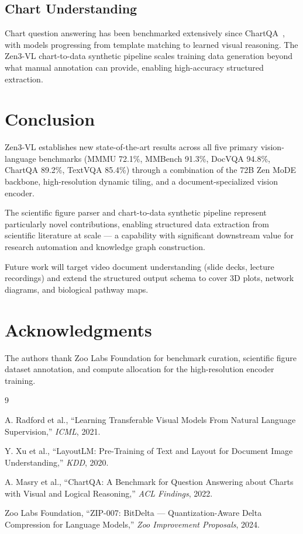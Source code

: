\documentclass[11pt,a4paper]{article}
\begin{document}
\subsection{Chart Understanding}

Chart question answering has been benchmarked extensively since ChartQA~\cite{chartqa},
with models progressing from template matching to learned visual reasoning. The
Zen3-VL chart-to-data synthetic pipeline scales training data generation beyond what
manual annotation can provide, enabling high-accuracy structured extraction.

\section{Conclusion}
\label{sec:conclusion}

Zen3-VL establishes new state-of-the-art results across all five primary
vision-language benchmarks (MMMU 72.1\%, MMBench 91.3\%, DocVQA 94.8\%,
ChartQA 89.2\%, TextVQA 85.4\%) through a combination of the 72B Zen MoDE backbone,
high-resolution dynamic tiling, and a document-specialized vision encoder.

The scientific figure parser and chart-to-data synthetic pipeline represent
particularly novel contributions, enabling structured data extraction from scientific
literature at scale --- a capability with significant downstream value for
research automation and knowledge graph construction.

Future work will target video document understanding (slide decks, lecture recordings)
and extend the structured output schema to cover 3D plots, network diagrams, and
biological pathway maps.

\section*{Acknowledgments}

The authors thank Zoo Labs Foundation for benchmark curation, scientific figure
dataset annotation, and compute allocation for the high-resolution encoder training.


\begin{thebibliography}{9}

A. Radford et al.,
``Learning Transferable Visual Models From Natural Language Supervision,''
\textit{ICML}, 2021.

Y. Xu et al.,
``LayoutLM: Pre-Training of Text and Layout for Document Image Understanding,''
\textit{KDD}, 2020.

A. Masry et al.,
``ChartQA: A Benchmark for Question Answering about Charts with Visual and Logical Reasoning,''
\textit{ACL Findings}, 2022.

Zoo Labs Foundation,
``ZIP-007: BitDelta --- Quantization-Aware Delta Compression for Language Models,''
\textit{Zoo Improvement Proposals}, 2024.

\end{thebibliography}
\end{document}
